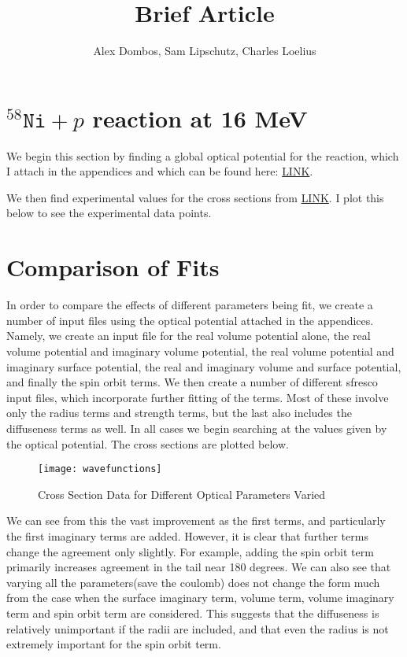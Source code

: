 \documentclass[11pt]{article} %
\title{Brief Article}
\author{Alex Dombos, Sam Lipschutz, Charles Loelius}
\begin{document}
\maketitle

\section{$^{58}\texttt{Ni}+p $ reaction at 16 MeV}

We begin this section by finding a global optical potential for the reaction, which I attach in the appendices and which can be found here: \url{LINK}.

We then find experimental values for the cross sections from \url{LINK}. I plot this below to see the experimental data points. \\


\section{Comparison of Fits}

In order to compare the effects of different parameters being fit, we create a number of input files using the optical potential attached in the appendices. Namely, we create an input file for the real volume potential alone, the real volume potential and imaginary volume potential, the real volume potential and imaginary surface potential, the real and imaginary volume and surface potential, and finally the spin orbit terms.  We then create a number of different sfresco input files, which incorporate further fitting of the terms. Most of these involve only the radius terms and strength terms, but the last also includes the diffuseness terms as well. In all cases we begin searching at the values given by the optical potential. The cross sections are plotted below.\\
\FloatBarrier
\begin{figure}[hbt!]
\texttt{[image: wavefunctions]}
\caption{Cross Section Data for Different Optical Parameters Varied}
\end{figure}
\FloatBarrier
\renewcommand{\arraystretch}{1.5}

We can see from this the vast improvement as the first terms, and particularly the first imaginary terms are added. However, it is clear that further terms change the agreement only slightly. For example, adding the spin orbit term primarily increases agreement in the tail near 180 degrees. We can also see that varying all the parameters(save the coulomb) does not change the form much from the case when the surface imaginary term, volume term, volume imaginary term and spin orbit term are considered. This suggests that the diffuseness is relatively unimportant if the radii are included, and that even the radius is not extremely important for the spin orbit term.
\end{document}
